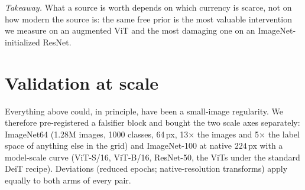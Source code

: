 \emph{Takeaway.} What a source is worth depends on which currency is
scarce, not on how modern the source is: the same free prior is the most
valuable intervention we measure on an augmented ViT and the most
damaging one on an ImageNet-initialized ResNet.

\section{Validation at scale}\label{sec:scale}

Everything above could, in principle, have been a small-image regularity.
We therefore pre-registered a falsifier block and bought the two scale
axes separately: ImageNet64 (1.28M images, 1000 classes, 64\,px,
13$\times$ the images and 5$\times$ the label space of anything else in
the grid) and ImageNet-100 at native $224$\,px with a model-scale curve
(ViT-S/16, ViT-B/16, ResNet-50, the ViTs under the standard DeiT recipe).
Deviations (reduced epochs; native-resolution transforms) apply equally
to both arms of every pair.


